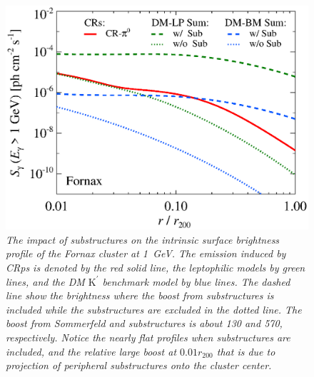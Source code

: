 \documentclass[10pt,aps,pra,reprint,amsmath,amsfonts,amssymb,showpacs,nofootinbib,floatfix]{revtex4-1}
\newcommand{\rmn}{\mathrm}
\newcommand{\Kp}{\rmn{K}^\prime}
\newcommand{\rvir}{r_{200}}
\begin{document}
\begin{figure}%
 \includegraphics[width=0.99\columnwidth]{figures/SB.resolved.v11.1GeV.SF300.noSuB.vs.SubMass.elmu.eps}
 \caption{\it The impact of substructures on the intrinsic surface
   brightness profile of the Fornax cluster at 1~GeV. The emission
   induced by CRps is denoted by the red solid line, the leptophilic
   models by green lines, and the DM $\Kp$ benchmark model by blue
   lines. The dashed line show the brightness where the boost from
   substructures is included while the substructures are excluded in
   the dotted line. The boost from Sommerfeld and substructures is
   about 130 and 570, respectively. Notice the nearly flat profiles
   when substructures are included, and the relative large boost at
   $0.01\rvir$ that is due to projection of peripheral substructures
   onto the cluster center.}
 \label{fig:SB_sub}
\end{figure}
\end{document}
